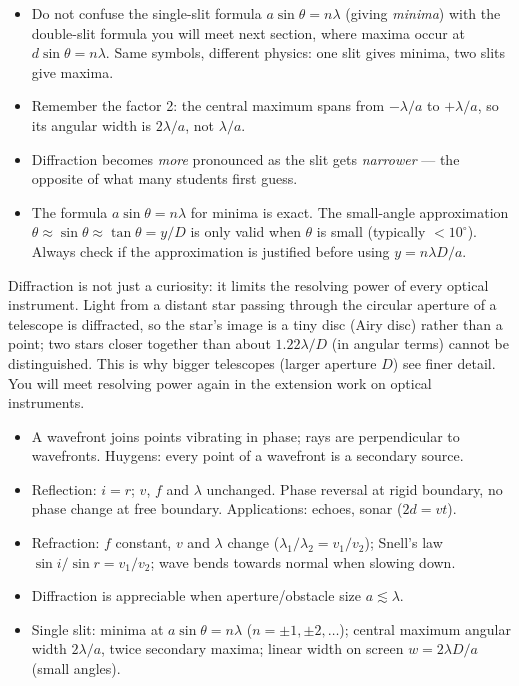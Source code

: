 \documentclass[11pt]{article}
\newcommand{\cle}[1]{{\popxbold\color{popdark}#1}}
\begin{document}
\begin{attention}
\begin{itemize}
\item Do not confuse the single-slit formula $a\sin\theta = n\lambda$ (giving \emph{minima}) with the double-slit formula you will meet next section, where maxima occur at $d\sin\theta = n\lambda$. Same symbols, different physics: one slit gives minima, two slits give maxima.
\item Remember the factor 2: the central maximum spans from $-\lambda/a$ to $+\lambda/a$, so its angular width is $2\lambda/a$, not $\lambda/a$.
\item Diffraction becomes \emph{more} pronounced as the slit gets \emph{narrower} --- the opposite of what many students first guess.
\item The formula $a\sin\theta = n\lambda$ for minima is exact. The small-angle approximation $\theta \approx \sin\theta \approx \tan\theta = y/D$ is only valid when $\theta$ is small (typically $< 10^\circ$). Always check if the approximation is justified before using $y = n\lambda D/a$.
\end{itemize}
\end{attention}

\begin{savaistu}
Diffraction is not just a curiosity: it limits the \cle{resolving power} of every optical instrument. Light from a distant star passing through the circular aperture of a telescope is diffracted, so the star's image is a tiny disc (Airy disc) rather than a point; two stars closer together than about $1.22\lambda/D$ (in angular terms) cannot be distinguished. This is why bigger telescopes (larger aperture $D$) see finer detail. You will meet resolving power again in the extension work on optical instruments.
\end{savaistu}

\begin{aretenir}
\begin{itemize}
\item A wavefront joins points vibrating in phase; rays are perpendicular to wavefronts. Huygens: every point of a wavefront is a secondary source.
\item Reflection: $i = r$; $v$, $f$ and $\lambda$ unchanged. Phase reversal at rigid boundary, no phase change at free boundary. Applications: echoes, sonar ($2d = vt$).
\item Refraction: $f$ constant, $v$ and $\lambda$ change ($\lambda_1/\lambda_2 = v_1/v_2$); Snell's law $\sin i/\sin r = v_1/v_2$; wave bends towards normal when slowing down.
\item Diffraction is appreciable when aperture/obstacle size $a \lesssim \lambda$.
\item Single slit: minima at $a\sin\theta = n\lambda$ ($n=\pm1,\pm2,\dots$); central maximum angular width $2\lambda/a$, twice secondary maxima; linear width on screen $w = 2\lambda D/a$ (small angles).
\end{itemize}
\end{aretenir}
\end{document}
